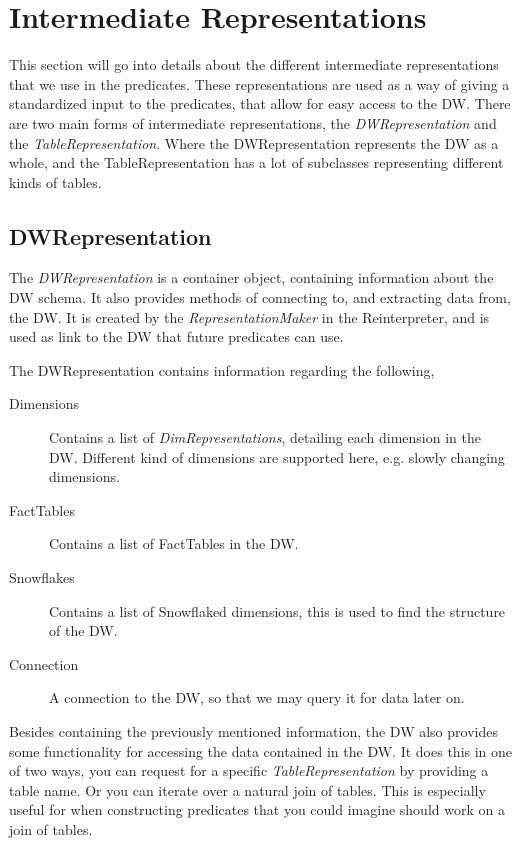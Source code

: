 \section{Intermediate Representations}
This section will go into details about the different intermediate representations that we use in the predicates. These representations are used as a way of giving a standardized input to the predicates, that allow for easy access to the DW. There are two main forms of intermediate representations, the \textit{DWRepresentation} and the \textit{TableRepresentation}. Where the DWRepresentation represents the DW as a whole, and the TableRepresentation has a lot of subclasses representing different kinds of tables. 

\subsection{DWRepresentation}
The \textit{DWRepresentation} is a container object, containing information about the DW schema. It also provides methods of connecting to, and extracting data from, the DW. It is created by the \textit{RepresentationMaker} in the Reinterpreter, and is used as link to the DW that future predicates can use.

The DWRepresentation contains information regarding the following,

\begin{description}
\item[Dimensions] Contains a list of \textit{DimRepresentations}, detailing each dimension in the DW. Different kind of dimensions are supported here, e.g. slowly changing dimensions.
\item[FactTables] Contains a list of FactTables in the DW.
\item[Snowflakes] Contains a list of Snowflaked dimensions, this is used to find the structure of the DW.
\item[Connection] A connection to the DW, so that we may query it for data later on.
\end{description}

Besides containing the previously mentioned information, the DW also provides some functionality for accessing the data contained in the DW. It does this in one of two ways, you can request for a specific \textit{TableRepresentation} by providing a table name. Or you can iterate over a natural join of tables. This is especially useful for when constructing predicates that you could imagine should work on a join of tables.

